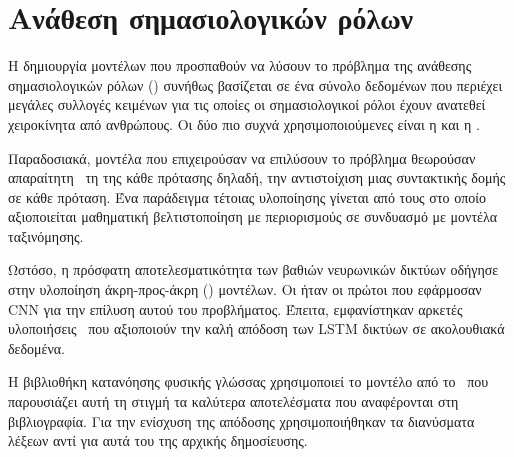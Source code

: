 \section{Ανάθεση σημασιολογικών ρόλων}
Η δημιουργία μοντέλων που προσπαθούν να λύσουν το πρόβλημα της ανάθεσης σημασιολογικών ρόλων (\SRLR{}) συνήθως βασίζεται σε ένα σύνολο δεδομένων που περιέχει μεγάλες συλλογές κειμένων για τις οποίες οι σημασιολογικοί ρόλοι έχουν ανατεθεί χειροκίνητα από ανθρώπους.
Οι δύο πιο συχνά χρησιμοποιούμενες είναι η  και η .

Παραδοσιακά, μοντέλα που επιχειρούσαν να επιλύσουν το πρόβλημα θεωρούσαν απαραίτητη~\cite{carreras2005introduction,punyakanok2008importance} τη  της κάθε πρότασης δηλαδή,
την αντιστοίχιση μιας συντακτικής δομής σε κάθε πρόταση.
Ένα παράδειγμα τέτοιας υλοποίησης γίνεται από τους \citet{koomen2005generalized} στο οποίο αξιοποιείται μαθηματική βελτιστοποίηση με περιορισμούς σε συνδυασμό με μοντέλα ταξινόμησης.

Ωστόσο, η πρόσφατη αποτελεσματικότητα των βαθιών νευρωνικών δικτύων οδήγησε στην υλοποίηση άκρη-προς-άκρη () μοντέλων.
Οι \citet{collobert2011natural} ήταν οι πρώτοι που εφάρμοσαν CNN για την επίλυση αυτού του προβλήματος.
Έπειτα, εμφανίστηκαν αρκετές υλοποιήσεις~\cite{zhou2015end,marcheggiani2017simple,he2017deep} που αξιοποιούν την καλή απόδοση των LSTM δικτύων σε ακολουθιακά δεδομένα.

Η βιβλιοθήκη κατανόησης φυσικής γλώσσας  χρησιμοποιεί το μοντέλο από το~\cite{he2017deep} που παρουσιάζει αυτή τη στιγμή τα καλύτερα αποτελέσματα που αναφέρονται στη βιβλιογραφία.
Για την ενίσχυση της απόδοσης χρησιμοποιήθηκαν τα διανύσματα λέξεων  αντί για αυτά του  της αρχικής δημοσίευσης.

